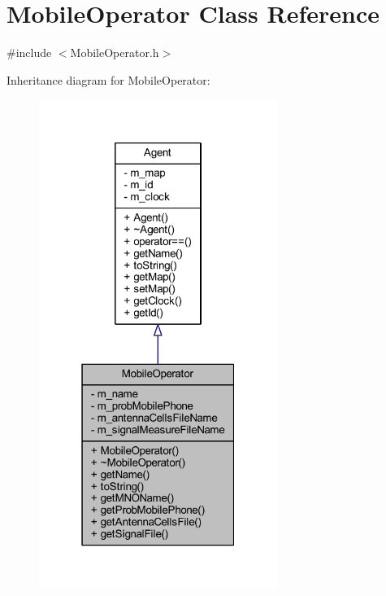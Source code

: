 \hypertarget{class_mobile_operator}{}\section{Mobile\+Operator Class Reference}
\label{class_mobile_operator}


{\ttfamily \#include $<$Mobile\+Operator.\+h$>$}



Inheritance diagram for Mobile\+Operator\+:\nopagebreak
\begin{figure}[H]
\begin{center}
\leavevmode
\includegraphics[width=220pt]{class_mobile_operator__inherit__graph}
\end{center}
\end{figure}


